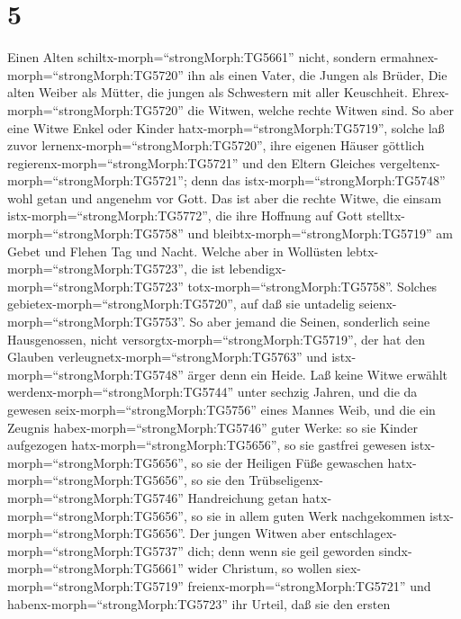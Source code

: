 \hypertarget{section-4}{%
\section{5}\label{section-4}}

 Einen Alten schiltx-morph=``strongMorph:TG5661'' nicht,
sondern ermahnex-morph=``strongMorph:TG5720'' ihn als einen Vater, die
Jungen als Brüder,  Die alten Weiber als Mütter, die jungen
als Schwestern mit aller Keuschheit. 
Ehrex-morph=``strongMorph:TG5720'' die Witwen, welche rechte Witwen
sind.  So aber eine Witwe Enkel oder Kinder
hatx-morph=``strongMorph:TG5719'', solche laß zuvor
lernenx-morph=``strongMorph:TG5720'', ihre eigenen Häuser göttlich
regierenx-morph=``strongMorph:TG5721'' und den Eltern Gleiches
vergeltenx-morph=``strongMorph:TG5721''; denn das
istx-morph=``strongMorph:TG5748'' wohl getan und angenehm vor Gott.
 Das ist aber die rechte Witwe, die einsam
istx-morph=``strongMorph:TG5772'', die ihre Hoffnung auf Gott
stelltx-morph=``strongMorph:TG5758'' und
bleibtx-morph=``strongMorph:TG5719'' am Gebet und Flehen Tag und Nacht.
 Welche aber in Wollüsten
lebtx-morph=``strongMorph:TG5723'', die ist
lebendigx-morph=``strongMorph:TG5723''
totx-morph=``strongMorph:TG5758''.  Solches
gebietex-morph=``strongMorph:TG5720'', auf daß sie untadelig
seienx-morph=``strongMorph:TG5753''.  So aber jemand die
Seinen, sonderlich seine Hausgenossen, nicht
versorgtx-morph=``strongMorph:TG5719'', der hat den Glauben
verleugnetx-morph=``strongMorph:TG5763'' und
istx-morph=``strongMorph:TG5748'' ärger denn ein Heide.  Laß
keine Witwe erwählt werdenx-morph=``strongMorph:TG5744'' unter sechzig
Jahren, und die da gewesen seix-morph=``strongMorph:TG5756'' eines
Mannes Weib,  und die ein Zeugnis
habex-morph=``strongMorph:TG5746'' guter Werke: so sie Kinder aufgezogen
hatx-morph=``strongMorph:TG5656'', so sie gastfrei gewesen
istx-morph=``strongMorph:TG5656'', so sie der Heiligen Füße gewaschen
hatx-morph=``strongMorph:TG5656'', so sie den
Trübseligenx-morph=``strongMorph:TG5746'' Handreichung getan
hatx-morph=``strongMorph:TG5656'', so sie in allem guten Werk
nachgekommen istx-morph=``strongMorph:TG5656''.  Der jungen
Witwen aber entschlagex-morph=``strongMorph:TG5737'' dich; denn wenn sie
geil geworden sindx-morph=``strongMorph:TG5661'' wider Christum, so
wollen siex-morph=``strongMorph:TG5719''
freienx-morph=``strongMorph:TG5721''  und
habenx-morph=``strongMorph:TG5723'' ihr Urteil, daß sie den ersten
